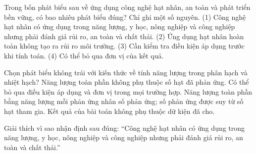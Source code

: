 \begin{ex}
Trong bốn phát biểu sau về ứng dụng công nghệ hạt nhân, an toàn và phát triển bền vững, có bao nhiêu phát biểu đúng? Chỉ ghi một số nguyên. (1) Công nghệ hạt nhân có ứng dụng trong năng lượng, y học, nông nghiệp và công nghiệp nhưng phải đánh giá rủi ro, an toàn và chất thải. (2) Ứng dụng hạt nhân hoàn toàn không tạo ra rủi ro môi trường. (3) Cần kiểm tra điều kiện áp dụng trước khi tính toán. (4) Có thể bỏ qua đơn vị của kết quả.
\end{ex}

\begin{ex}
Chọn phát biểu không trái với kiến thức về tính năng lượng trong phân hạch và nhiệt hạch?
\choice
{Năng lượng toàn phần không phụ thuộc số hạt đã phản ứng.}
{Có thể bỏ qua điều kiện áp dụng và đơn vị trong mọi trường hợp.}
{\True Năng lượng toàn phần bằng năng lượng mỗi phản ứng nhân số phản ứng; số phản ứng được suy từ số hạt tham gia.}
{Kết quả của bài toán không phụ thuộc dữ kiện đã cho.}
\end{ex}

\begin{bt}
Giải thích vì sao nhận định sau đúng: “Công nghệ hạt nhân có ứng dụng trong năng lượng, y học, nông nghiệp và công nghiệp nhưng phải đánh giá rủi ro, an toàn và chất thải.”
\end{bt}

